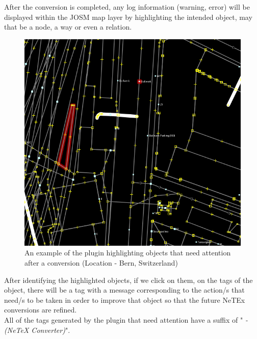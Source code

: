 After the conversion is completed, any log information (warning, error) will be displayed within the JOSM map layer by highlighting the intended object, may that be a node, a way or even a relation.
\begin{figure}[H]
	\includegraphics[width=\linewidth]{./Images/ArchitectureDesign/highlight_example.png}
	\caption{An example of the plugin highlighting objects that need attention after a conversion (Location - Bern, Switzerland)}
\end{figure}
After identifying the highlighted objects, if we click on them, on the tags of the object, there will be a tag with a message corresponding to the action/s that need/s to be taken in order to improve that object so that the future NeTEx conversions are refined.\\
All of the tags generated by the plugin that need attention have a suffix of "\textit{ - (NeTeX Converter)}".


